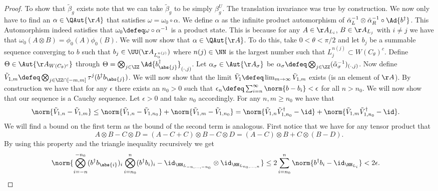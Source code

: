 \begin{proof}
	To show that $\tilde{\beta}_g$ exists note that we can take $\tilde{\beta}_g$ to be simply $\beta_g^{U}$. The translation invariance was true by construction. We now only have to find an $\alpha\in\QAut{\AA}$ that satisfies $\omega=\omega_0\circ\alpha$. We define $\alpha$ as the infinite product automorphism of $\tilde{\alpha}_L^{-1}\otimes\tilde{\alpha}_R^{-1}\circ\Ad{b^\dagger}$. This Automorphism indeed satisfies that $\omega_0\defeq \omega\circ\alpha^{-1}$ is a product state. This is because for any $A\in\AA_{L_{i}}$, $B\in\AA_{L_{j}}$ with $i\neq j$ we have that $\omega_0(A\otimes B)=\phi_0(A)\phi_0(B)$. We will now show that $\alpha\in\QAut{\AA}$. To do this, take $0<\theta<\pi/2$ and let $b_j$ be a summable sequence converging to $b$ such that $b_j\in\UU(\AA_{L_0^{n(j)}})$ where $n(j)\in\NN$ is the largest number such that $L_{j}^{n(j)}\subset W(C_\theta)^c$. Define $\Theta\in\Aut{\AA_{W(C_\theta)^c}}$ through $\Theta=\bigotimes_{j\in\ZZ}\Ad{b_\abs{j}^\dagger}_{(\cdot,j)}$. Let $\alpha_\sigma\in\Aut{\AA_\sigma}$ be $\alpha_\sigma\defeq \bigotimes_{j\in\ZZ}(\tilde\alpha_\sigma^{-1})_{(\cdot,j)}$. Now define $\tilde V_{1,m}\defeq\bigotimes_{j\in\ZZ\cap[-m,m]}\tau^j (b^\dagger b_\abs{j})$. We will now show that the limit $\tilde V_1\defeq\lim_{m\rightarrow\infty}\tilde V_{1,m}$ exists (is an element of $\AA$). By construction we have that for any $\epsilon$ there exists an $n_0>0$ such that $\epsilon_n\defeq\sum_{i=n}^\infty\norm{b-b_i}<\epsilon$ for all $n>n_0$. We will now show that our sequence is a Cauchy sequence. Let $\epsilon>0$ and take $n_0$ accordingly. For any $n,m\geq n_0$ we have that
	\begin{align}
		\norm{\tilde{V}_{1,n}-\tilde{V}_{1,m}}&\leq \norm{\tilde{V}_{1,n}-\tilde{V}_{1,n_0}}+\norm{\tilde{V}_{1,m}-\tilde{V}_{1,n_0}}=\norm{\tilde{V}_{1,n}\tilde{V}_{1,n_0}^\dagger-\id}+\norm{\tilde{V}_{1,m}\tilde{V}_{1,n_0}^\dagger-\id}.
	\end{align}
	We will find a bound on the first term as the bound of the second term is analogous. First notice that we have for any tensor product that
	\begin{equation}
		A\otimes B-C\otimes D=(A-C+C)\otimes B-C\otimes D=(A-C)\otimes B+C\otimes (B-D).
	\end{equation}
	By using this property and the triangle inequality recursively we get
	\begin{align}
		&\norm{\bigotimes_{i=-n}^{-n_0}(b^\dagger b_\abs{i})_i\bigotimes_{i=n_0}^{n}(b^\dagger b_i)_i-\id_{\HH_{L_{-n,\ldots,-n_0}}}\otimes\id_{\HH_{L_{n_0,\ldots,n}}}}\leq 2\sum_{i=n_0}^{n}\norm{b^\dagger b_i-\id_{\HH_{L_i}}}<2\epsilon.

\end{align}
\end{proof}
